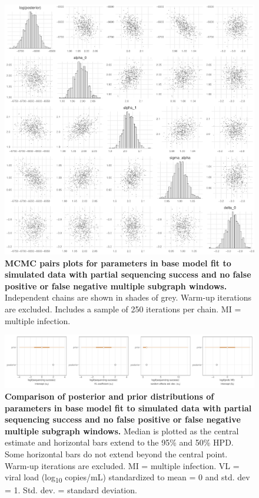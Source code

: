 \documentclass[10pt,letterpaper]{article}
\begin{document}
\begin{figure}[!ht]
 \includegraphics[width=1\textwidth]{../../figures/base_simulation_base_pairs.pdf}
\caption{{\bf MCMC pairs plots for parameters in base model fit to simulated data with partial sequencing success and no false positive or false negative multiple subgraph windows.} Independent chains are shown in shades of grey. Warm-up iterations are excluded. Includes a sample of 250 iterations per chain. MI = multiple infection.}
\end{figure}

\begin{figure}[!ht]
 \includegraphics[width=1\textwidth]{../../figures/base_simulation_base_prior.pdf}
\caption{{\bf Comparison of posterior and prior distributions of parameters in base model fit to simulated data with partial sequencing success and no false positive or false negative multiple subgraph windows.} Median is plotted as the central estimate and horizontal bars extend to the 95\% and 50\% HPD. Some horizontal bars do not extend beyond the central point. Warm-up iterations are excluded. MI = multiple infection. VL = viral load (log\textsubscript{10} copies/mL) standardized to mean = 0 and std. dev = 1. Std. dev. = standard deviation. }
\end{figure}
\end{document}
